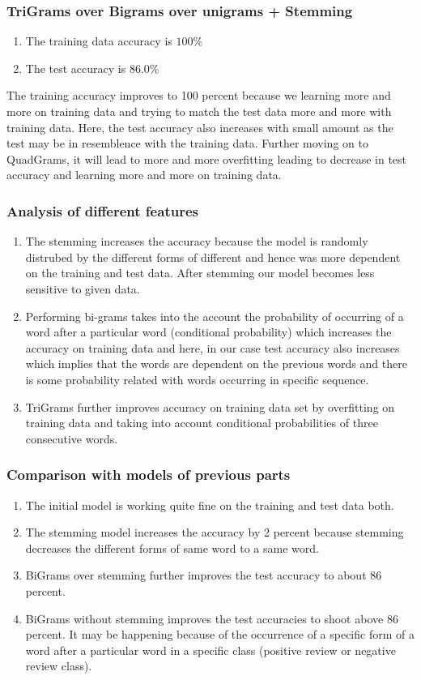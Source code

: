 \documentclass[11pt]{article}
\begin{document}
\subsubsection{TriGrams over Bigrams over unigrams + Stemming}
\begin{enumerate}
  \item The training data accuracy is $100\%$
  \item The test accuracy is $86.0\%$
\end{enumerate}
The training accuracy improves to 100 percent because we learning more and more on training data and trying to match the test data more and more with training data. Here, the test accuracy also increases with small amount as the test may be in resemblence with the training data. Further moving on to QuadGrams, it will lead to more and more overfitting leading to decrease in test accuracy and learning more and more on training data.
\subsubsection{Analysis of different features}
\begin{enumerate}
  \item The stemming increases the accuracy because the model is randomly distrubed by the different forms of different and hence was more dependent on the training and test data. After stemming our model becomes less sensitive to given data.  
  \item Performing bi-grams takes into the account the probability of occurring of a word after a particular word (conditional probability) which increases the accuracy on training data and here, in our case test accuracy also increases which implies that the words are dependent on the previous words and there is some probability related with words occurring in specific sequence.
  \item TriGrams further improves accuracy on training data set by overfitting on training data and taking into account conditional probabilities of three consecutive words. 
\end{enumerate}
\subsubsection{Comparison with models of previous parts}
\begin{enumerate}
  \item The initial model is working quite fine on the training and test data both.
  \item The stemming model increases the accuracy by 2 percent because stemming decreases the different forms of same word to a same word.
  \item BiGrams over stemming further improves the test accuracy to about 86 percent.
  \item BiGrams without stemming improves the test accuracies to shoot above 86 percent. It may be happening because of the occurrence of a specific form of a word after a particular word in a specific class (positive review or negative review class).
\end{enumerate}
\end{document}
